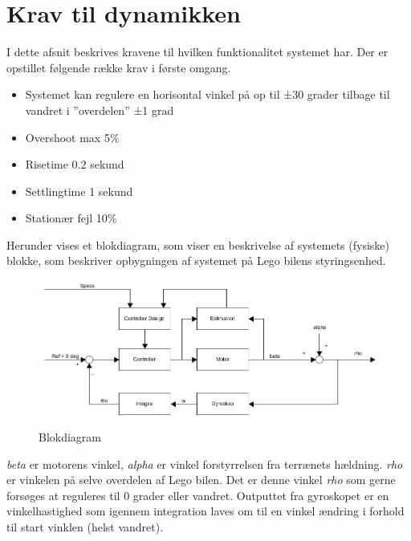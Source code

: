 \section{Krav til dynamikken}

I dette afsnit beskrives kravene til hvilken funktionalitet systemet har. Der er opstillet følgende række krav i første omgang.
\begin{itemize}
	\item Systemet kan regulere en horisontal vinkel på op til ±30 grader tilbage til vandret i ”overdelen” ±1 grad
	\item Overshoot max 5\%
	\item Risetime 0.2 sekund 
	\item Settlingtime 1 sekund 
	\item Stationær fejl 10\%  
	
\end{itemize}



Herunder vises et blokdiagram, som viser en beskrivelse af systemets (fysiske) blokke, som beskriver opbygningen af systemet på Lego bilens styringsenhed. 


\begin{figure}[H]
	\centering
	\includegraphics[width = 400 pt]{figur/blokdiagram.png}
	\caption{Blokdiagram}
	\label{fig:Blokdiagram}
\end{figure}

\textit{beta} er motorens vinkel,\textit{ alpha} er vinkel forstyrrelsen fra terrænets hældning. \textit{rho} er vinkelen på selve overdelen af Lego bilen. Det er denne vinkel \textit{rho} som gerne forsøges at reguleres til 0 grader eller vandret. Outputtet fra gyroskopet er en vinkelhastighed som igennem integration laves om til en vinkel ændring i forhold til start vinklen (helst vandret). 